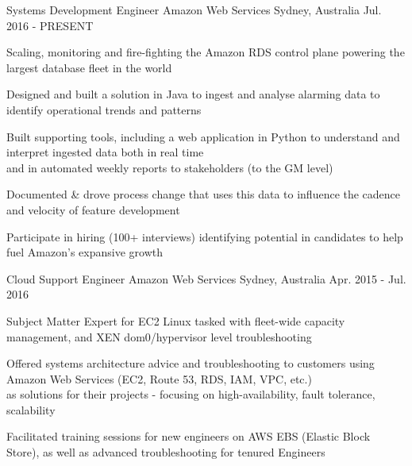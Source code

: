 

\begin{cventries}

  \cventry
    {Systems Development Engineer} %
    {Amazon Web Services} %
    {Sydney, Australia} %
    {Jul. 2016 - PRESENT} %
    {
      \begin{cvitems} %
        \item {Scaling, monitoring and fire-fighting the Amazon RDS control plane powering the largest database fleet in the world}
        \item {Designed and built a solution in Java to ingest and analyse alarming data to identify operational trends and patterns }
        \item {Built supporting tools, including a web application in Python to understand and interpret ingested data both in real time\\
        and in automated weekly reports to stakeholders (to the GM level)}
        \item {Documented \& drove process change that uses this data to influence the cadence and velocity of feature development }
        \item {Participate in hiring (100+ interviews) identifying potential in candidates to help fuel Amazon's expansive growth}
      \end{cvitems}
    }

  \cventry
    {Cloud Support Engineer} %
    {Amazon Web Services} %
    {Sydney, Australia} %
    {Apr. 2015 - Jul. 2016} %
    {
      \begin{cvitems} %
        \item {Subject Matter Expert for EC2 Linux tasked with fleet-wide capacity management, and XEN dom0/hypervisor level troubleshooting}
        \item {Offered systems architecture advice and troubleshooting to customers using Amazon Web Services (EC2, Route 53, RDS, IAM, VPC, etc.)\\
        as solutions for their projects - focusing on high-availability, fault tolerance, scalability}
        \item {Facilitated training sessions for new engineers on AWS EBS (Elastic Block Store), as well as advanced troubleshooting for tenured Engineers}
      \end{cvitems}
    }


\end{cventries}
